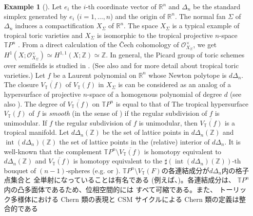 \documentclass[a4paper,dvipdfmx,reqno,12pt]{amsart}
\theoremstyle{definition}
\newtheorem{example}[theorem]{Example}
\newcommand{\opn}[1]{\operatorname{#1}}
\numberwithin{equation}{section}
\begin{document}
\begin{example}[{\cite[Example 2.11]{demedrano2023chern}}]
\label{example-TPn}
Let $e_i$ the $i$-th coordinate vector of $\mathbb{R}^n$
and $\Delta_{n}$ be the standard simplex generated by
$e_i$ ($i=1,\ldots,n$) and the origin of $\mathbb{R}^n$.
The normal fan $\Sigma$ of $\Delta_{n}$ induces 
a compactification $X_{\Sigma}$ of $\mathbb{R}^n$.
The space $X_{\Sigma}$ is a typical example of
tropical toric varieties \cite{MR2428356,MR2511632}
and $X_{\Sigma}$ is
isomorphic to the tropical projective
$n$-space $\mathbb{T}P^{n}$ \cite[Example 3.10]{MR2275625}.
From a direct calculation of the \v{C}ech cohomology of
$\mathcal{O}_{X_{\Sigma}}^{\times}$, we get 
$H^{1}(X;\mathcal{O}_{X_{\Sigma}}^{\times})
\simeq H^{1,1}(X;\mathbb{Z})\simeq \mathbb{Z}$.
In general, the Picard group of toric 
schemes over semifields is studied in \cite{MR4016643}. 
(See also  and
\cite[Chapter 3]{mikhalkin2018tropical} for more detail
about tropical toric varieties.)
Let $f$ be a Laurent polynomial on $\mathbb{R}^{n}$
whose Newton polytope is $d\Delta_{n}$.
The closure $\overline{V_{\mathbb{T}}(f)}$ of 
$V_{\mathbb{T}}(f)$ in $X_{\Sigma}$
is can be considered
as an analog of a hypersurface of projective $n$-space of
a homogenous polynomial of degree $d$
(see also \cite[Definition 3.4.6]{mikhalkin2018tropical}).
The degree of $\overline{V_{\mathbb{T}}(f)}$
on $\mathbb{T}P^n$ is equal to 
that of
The tropical hypersurface $V_{\mathbb{T}}(f)$ of $f$
is \emph{smooth} (in the sense of
\cite[]{MR3287221})
if the regular subdivision of $f$ is unimodular.
If $f$ the regular subdivision of $f$ is unimodular,
then $\overline{V_{\mathbb{T}}(f)}$ is a tropical manifold.
Let $d\Delta_n(\mathbb{Z})$ be the set of lattice points
in $d\Delta_n(\mathbb{Z})$ and 
$\opn{int}(d\Delta_n)(\mathbb{Z})$ the set of lattice points
in the (relative) interior of $d\Delta_n$.
It is well-known that the complement 
$\mathbb{T}P^{n}\setminus
\overline{V_{\mathbb{T}}(f)}$ is homotopy equivalent
to $d\Delta_n(\mathbb{Z})$ and 
$\overline{V_{\mathbb{T}}(f)}$ is homotopy equivalent
to the $\sharp (\opn{int}(d\Delta_n)(\mathbb{Z}))$-th
bouquet of $(n-1)$-spheres
(e.g. \cite[Proposition 3.1.6]{MR3287221}
or \cite[Proposition 3.4.12]{mikhalkin2018tropical}).
$\mathbb{T}P^{n}\setminus
V_{\mathbb{T}}(F)$の各連結成分が$d\Delta_n$内の格子点集合と
全単射になっていることは有名である
(例えば、\cite[Proposition 3.1.6]{MR3287221})。各連結成分は、
$\mathbb{T}P^{n}$内の凸多面体であるため、位相空間的には
すべて可縮である。また、
トーリック多様体における Chern 類の表現と
CSM サイクルによる Chern 類の定義は整合的である

\end{example}
\end{document}
